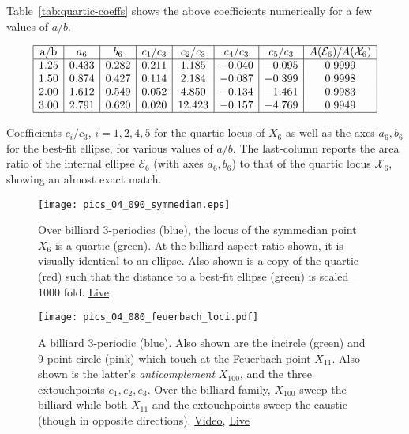 Table~\ref{tab:quartic-coeffs} shows the above coefficients numerically for a few values of $a/b$.

\begin{table}
    \centering
$$
\begin{array}{|c|c|c|c|c|c|c|c|}
\hline
 \text{a/b} & a_6 & b_6 & c_1/c_3 & c_2/c_3 & c_4/c_3 & c_5/c_3 & A(\mathcal{E}_6)/A(\mathcal{X}_6) \\
 \hline
  1.25 & 0.433 & 0.282 & 0.211 & 1.185 & -0.040 & -0.095 & 0.9999 \\
 1.50 & 0.874 & 0.427 & 0.114 & 2.184 & -0.087 & -0.399 & 0.9998 \\
 2.00 & 1.612 & 0.549 & 0.052 & 4.850 & -0.134 & -1.461 & 0.9983 \\
 3.00 & 2.791 & 0.620 & 0.020 & 12.423 & -0.157 & -4.769 & 0.9949 \\
 \hline
\end{array}
$$
\caption{Coefficients $c_i/c_3$, $i=1,2,4,5$ for the quartic locus of $X_6$ as well as the axes $a_6,b_6$ for the best-fit ellipse, for various values of $a/b$. The last-column reports the area ratio of the internal ellipse $\mathcal{E}_6$ (with axes $a_6,b_6$) to that of the quartic locus $\mathcal{X}_6$, showing an almost exact match.}
\label{tab:quartic-coeffs}
\end{table}


\begin{figure}
    \centering
    \texttt{[image: pics\_04\_090\_symmedian.eps]}
    \caption{Over billiard 3-periodics (blue), the locus of the symmedian point $X_6$ is a quartic (green). At the billiard aspect ratio shown, it is visually identical to an ellipse. Also shown is a copy of the quartic (red) such that the distance to a best-fit ellipse (green) is scaled 1000 fold. \href{https://bit.ly/3hxOZoV}{Live}}
    \label{fig:04-locus-x6}
\end{figure}

\begin{figure}
    \centering
    \texttt{[image: pics\_04\_080\_feuerbach\_loci.pdf]}
    \caption{A billiard 3-periodic (blue). Also shown are the incircle (green) and 9-point circle (pink) which touch at the Feuerbach point $X_{11}$. Also shown is the latter's {\em anticomplement} $X_{100}$, and the three extouchpoints $e_1,e_2,e_3$. Over the billiard family, $X_{100}$ sweep the billiard while both $X_{11}$ and the extouchpoints sweep the caustic (though in opposite directions).
    \href{https://youtu.be/TXdg7tUl8lc}{Video},
    \label{fig:04-feuer-loci} \href{https://bit.ly/2S2LVqp}{Live}}
\end{figure}

